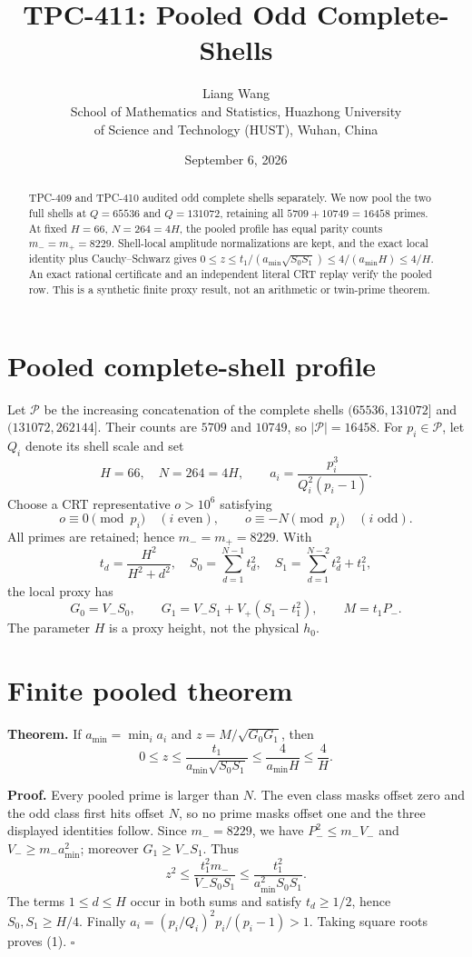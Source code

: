\documentclass[11pt]{article}
\title{TPC-411: Pooled Odd Complete-Shells}
\author{Liang Wang\\School of Mathematics and Statistics, Huazhong University\\of Science and Technology (HUST), Wuhan, China}
\date{September 6, 2026}
\begin{document}
\maketitle

\begin{abstract}
TPC-409 and TPC-410 audited odd complete shells separately.  We now pool the
two full shells at $Q=65536$ and $Q=131072$, retaining all $5709+10749=16458$
primes.  At fixed $H=66$, $N=264=4H$, the pooled profile has equal parity
counts $m_-=m_+=8229$.  Shell-local amplitude normalizations are kept, and
the exact local identity plus Cauchy--Schwarz gives
$0\le z\le t_1/(a_{\min}\sqrt{S_0S_1})\le4/(a_{\min}H)\le4/H$.
An exact rational certificate and an independent literal CRT replay verify
the pooled row.  This is a synthetic finite proxy result, not an arithmetic
or twin-prime theorem.
\end{abstract}

\section{Pooled complete-shell profile}
Let $\mathcal P$ be the increasing concatenation of the complete shells
$(65536,131072]$ and $(131072,262144]$.  Their counts are $5709$ and $10749$,
so $|\mathcal P|=16458$.  For $p_i\in\mathcal P$, let $Q_i$ denote its
shell scale and set
\[
 H=66,\quad N=264=4H,\qquad
 a_i=\frac{p_i^3}{Q_i^2(p_i-1)}.
\]
Choose a CRT representative $o>10^6$ satisfying
\[
 o\equiv0\pmod {p_i}\quad(i\text{ even}),\qquad
 o\equiv-N\pmod {p_i}\quad(i\text{ odd}).
\]
All primes are retained; hence $m_-=m_+=8229$.  With
\[
 t_d=\frac{H^2}{H^2+d^2},\quad S_0=\sum_{d=1}^{N-1}t_d^2,
 \quad S_1=\sum_{d=1}^{N-2}t_d^2+t_1^2,
\]
the local proxy has
\[
 G_0=V_-S_0,\qquad G_1=V_-S_1+V_+(S_1-t_1^2),\qquad M=t_1P_-.
\]
The parameter $H$ is a proxy height, not the physical $h_0$.

\section{Finite pooled theorem}
\textbf{Theorem.} If $a_{\min}=\min_i a_i$ and
$z=M/\sqrt{G_0G_1}$, then
\[
0\le z\le\frac{t_1}{a_{\min}\sqrt{S_0S_1}}
\le\frac4{a_{\min}H}\le\frac4H. \tag{1}
\]

\textbf{Proof.} Every pooled prime is larger than $N$.  The even class masks
offset zero and the odd class first hits offset $N$, so no prime masks offset
one and the three displayed identities follow.  Since $m_-=8229$, we have
$P_-^2\le m_-V_-$ and $V_-\ge m_-a_{\min}^2$; moreover
$G_1\ge V_-S_1$.  Thus
\[
 z^2\le\frac{t_1^2m_-}{V_-S_0S_1}
 \le\frac{t_1^2}{a_{\min}^2S_0S_1}.
\]
The terms $1\le d\le H$ occur in both sums and satisfy $t_d\ge1/2$, hence
$S_0,S_1\ge H/4$.  Finally
$a_i=(p_i/Q_i)^2p_i/(p_i-1)>1$.  Taking square roots proves (1).
\hfill$\square$
\end{document}
